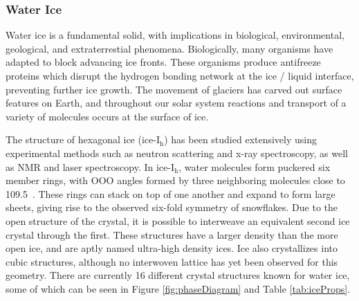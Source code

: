 \subsubsection{Water Ice}
%
%
Water ice is a fundamental solid, with implications in biological,
environmental, geological, and extraterrestial
phenomena.\cite{Shultz2017} Biologically, many organisms have adapted
to block advancing ice fronts. These organisms produce antifreeze
proteins which disrupt the hydrogen bonding network at the ice /
liquid interface, preventing further ice growth. The movement of
glaciers has carved out surface features on Earth, and throughout our
solar system reactions and transport of a variety of molecules
occurs at the surface of ice.


The structure of hexagonal ice (ice-I$_\mathrm{h}$) has been studied
extensively using experimental methods such as neutron scattering and
x-ray spectroscopy, as well as NMR and laser
spectroscopy.\cite{Kuhs2012} In ice-I$_\mathrm{h}$, water molecules form
puckered six member rings, with OOO angles formed by three neighboring
molecules close to 109.5\degree~. These rings can stack on top of one
another and expand to form large sheets, giving rise to the observed
six-fold symmetry of snowflakes. Due to the open structure of the
crystal, it is possible to interweave an equivalent second ice crystal
through the first. These structures have a larger density than the
more open ice, and are aptly named ultra-high density ices. Ice also
crystallizes into cubic structures, although no interwoven lattice has
yet been observed for this geometry. There are currently 16
different crystal structures known for water ice, some of which can be
seen in Figure \ref{fig:phaseDiagram} and Table \ref{tab:iceProps}.

